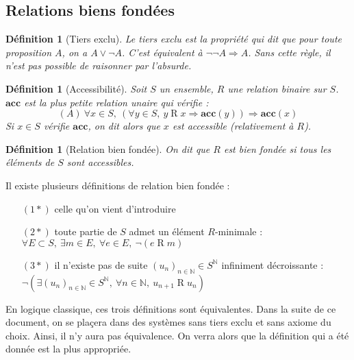 \documentclass[a4paper,12pt]{article}
\theoremstyle{plain}
\newtheorem{defi}[theo]{Définition}
\begin{document}
\subsection{Relations biens fondées}
\label{RBF}

\begin{defi}[Tiers exclu]
Le tiers exclu est la propriété qui dit que pour toute proposition $A$, on a $A \lor \neg A$. C'est équivalent à $\neg \neg A \Rightarrow A$. Sans cette règle, il n'est pas possible de raisonner par l'absurde. 
\end{defi}

\begin{defi}[Accessibilité]
\label{acces}
Soit $S$ un ensemble, $R$ une relation binaire sur $S$. $\mathbf{acc}$ est la plus petite relation unaire qui vérifie :
$$(A) \ \forall x \in S, \  ( \forall y \in S, \ y\mathbin{R} x \Rightarrow\mathbf{acc}(y) ) \Rightarrow\mathbf{acc}(x) $$ 
Si $x \in S$ vérifie $\mathbf{acc}$, on dit alors que $x$ est accessible (relativement à $R$).
\end{defi}

\begin{defi}[Relation bien fondée]
\label{BF}
On dit que $R$ est bien fondée si tous les éléments de $S$ sont accessibles.
\end{defi}

Il existe plusieurs définitions de relation bien fondée :

\begin{itemize}
\setlength\itemsep{ -1.3 em}
\item[$(1*)$] celle qu'on vient d'introduire\\
\item[$(2*)$] toute partie de $S$ admet un élément $R$-minimale :\\ $\forall E \subset S, \ \exists m \in E, \ \forall e \in E, \ \neg (e \mathbin{R} m)$\\
\item[$(3*)$] il n'existe pas de suite $(u_n)_{n \in \mathbb{N}} \in S^{\mathbb{N}}$ infiniment décroissante :\\ $\neg( \exists (u_n)_{n \in \mathbb{N}} \in S^{\mathbb{N}}, \ \forall n \in \mathbb{N}, \ u_{n+1} \mathbin{R} u_n)$
\end{itemize}

En logique classique, ces trois définitions sont équivalentes. Dans la suite de ce document, on se plaçera dans des systèmes sans tiers exclu et sans axiome du choix. Ainsi, il n'y aura pas équivalence. On verra alors que la définition qui a été donnée est la plus appropriée.
\end{document}
